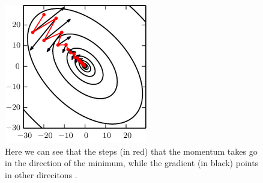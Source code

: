 \begin{figure}[th]
\centering
\includegraphics{Figures/momentum}
\decoRule
\caption[Momentum]{Here we can see that the steps (in red) that the momentum takes go in the direction of the minimum, while the gradient (in black) points in other direcitons \parencite{deep-learning}.}
\label{fig:momentum}
\end{figure}